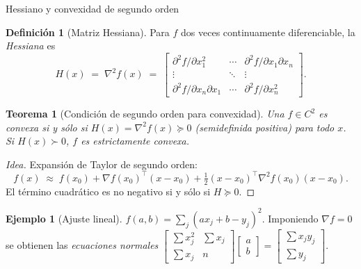 \documentclass[10pt,aspectratio=169]{beamer}
\theoremstyle{definition}
\newtheorem{definicion}{Definición}
\newtheorem{ejemplo}{Ejemplo}
\theoremstyle{plain}
\newtheorem{teorema}{Teorema}
\begin{document}
\begin{frame}[t]{Hessiano y convexidad de segundo orden}
  \begin{definicion}[Matriz Hessiana]
    Para $f$ dos veces continuamente diferenciable, la \emph{Hessiana} es
    \[
      H(x) \;=\; \nabla^{2} f(x) \;=\;
      \begin{bmatrix}
        \partial^{2}f/\partial x_{1}^{2} & \cdots & \partial^{2}f/\partial x_{1}\partial x_{n}\\
        \vdots & \ddots & \vdots\\
        \partial^{2}f/\partial x_{n}\partial x_{1} & \cdots & \partial^{2}f/\partial x_{n}^{2}
      \end{bmatrix}.
    \]
  \end{definicion}

  \vspace{0.2em}
  \begin{teorema}[Condición de segundo orden para convexidad]
    Una $f\in C^{2}$ es convexa si y sólo si $H(x)=\nabla^{2}f(x)\succeq 0$
    (semidefinida positiva) para todo $x$. Si $H(x)\succ 0$, $f$ es
    \emph{estrictamente} convexa.
  \end{teorema}

  \begin{proof}[Idea]
    Expansión de Taylor de segundo orden:
    \[
      f(x) \;\approx\; f(x_{0}) + \nabla f(x_{0})^{\top}(x-x_{0})
                + \tfrac{1}{2}(x-x_{0})^{\top}\nabla^{2}f(x_{0})(x-x_{0}).
    \]
    El término cuadrático es no negativo si y sólo si $H\succeq 0$.
  \end{proof}

  \vspace{0.2em}
  \begin{ejemplo}[Ajuste lineal]
    $f(a,b)=\sum_{j}(ax_{j}+b-y_{j})^{2}$. Imponiendo $\nabla f=0$ se obtienen
    las \emph{ecuaciones normales}
    $\begin{bmatrix}\sum x_{j}^{2} & \sum x_{j}\\ \sum x_{j} & n\end{bmatrix}
      \begin{bmatrix}a\\ b\end{bmatrix}
      = \begin{bmatrix}\sum x_{j}y_{j}\\ \sum y_{j}\end{bmatrix}$.
  \end{ejemplo}
\end{frame}
\end{document}
